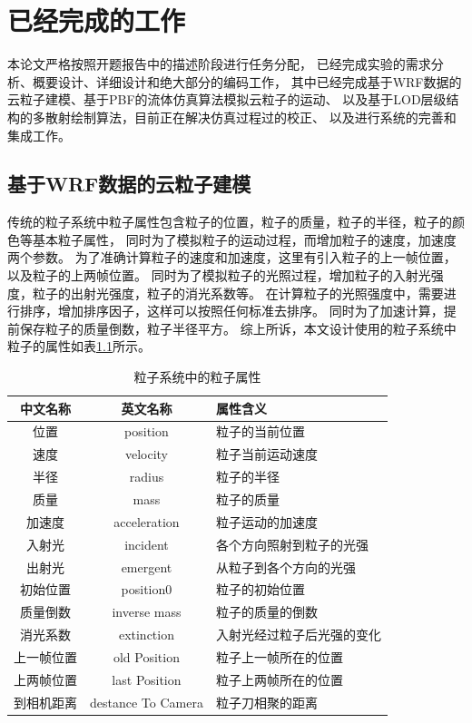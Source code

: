 
\chapter{已经完成的工作}
\label{chap:have_finished}
\qquad{}本论文严格按照开题报告中的描述阶段进行任务分配，
已经完成实验的需求分析、概要设计、详细设计和绝大部分的编码工作，
其中已经完成基于WRF数据的云粒子建模、基于PBF的流体仿真算法模拟云粒子的运动、
以及基于LOD层级结构的多散射绘制算法，目前正在解决仿真过程过的校正、
以及进行系统的完善和集成工作。

\section{基于WRF数据的云粒子建模}

传统的粒子系统中粒子属性包含粒子的位置，粒子的质量，粒子的半径，粒子的颜色等基本粒子属性，
同时为了模拟粒子的运动过程，而增加粒子的速度，加速度两个参数。
为了准确计算粒子的速度和加速度，这里有引入粒子的上一帧位置，以及粒子的上两帧位置。
同时为了模拟粒子的光照过程，增加粒子的入射光强度，粒子的出射光强度，粒子的消光系数等。
在计算粒子的光照强度中，需要进行排序，增加排序因子，这样可以按照任何标准去排序。
同时为了加速计算，提前保存粒子的质量倒数，粒子半径平方。
综上所诉，本文设计使用的粒子系统中粒子的属性如表\ref{tab:parital-attri}所示。
\begin{table}
	\centering
	\caption{粒子系统中的粒子属性}
	\label{tab:parital-attri}
	\begin{tabular}{c|c|l}
		\hline
		\textbf{中文名称} & \textbf{英文名称} & \textbf{属性含义} \\ \hline
		位置 & position & 粒子的当前位置 \\ \hline
		速度  & velocity & 粒子当前运动速度 \\ \hline 
		半径 & radius & 粒子的半径 \\ \hline
		质量 & mass & 粒子的质量 \\ \hline 
		加速度 & acceleration & 粒子运动的加速度 \\ \hline
		入射光 & incident & 各个方向照射到粒子的光强 \\ \hline
		出射光 & emergent & 从粒子到各个方向的光强  \\ \hline
		初始位置 & position0 & 粒子的初始位置 \\ \hline
		质量倒数 & inverse mass & 粒子的质量的倒数 \\ \hline 
		消光系数 & extinction & 入射光经过粒子后光强的变化 \\ \hline
		上一帧位置 & old Position & 粒子上一帧所在的位置 \\ \hline
		上两帧位置 & last Position & 粒子上两帧所在的位置 \\ \hline
		到相机距离 & destance To Camera & 粒子刀相聚的距离 \\ \hline
	\end{tabular}
\end{table}

